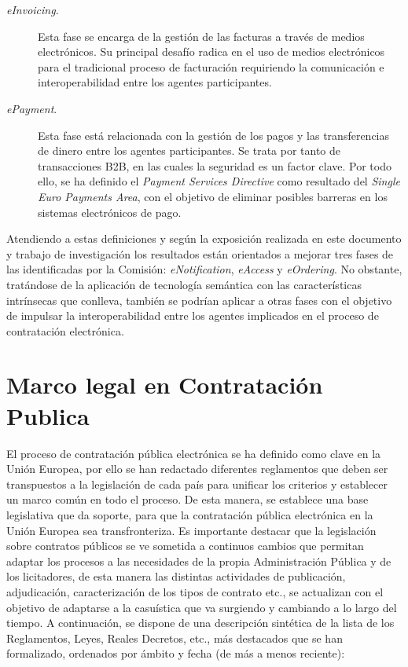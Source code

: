 \begin{description}
\item [\textit{eInvoicing}.] Esta fase se encarga de la gestión de las facturas a través de medios
electrónicos. Su principal desafío radica en el uso de medios electrónicos para el tradicional 
proceso de facturación requiriendo la comunicación e interoperabilidad entre los agentes
participantes.

\item [\textit{ePayment}.] Esta fase está relacionada con la gestión de los pagos y las transferencias
de dinero entre los agentes participantes. Se trata por tanto de transacciones B2B, en las cuales
la seguridad es un factor clave. Por todo ello, se ha definido el \textit{Payment Services Directive}
como resultado del \textit{Single Euro Payments Area}, con el objetivo de eliminar posibles barreras
en los sistemas electrónicos de pago.
\end{description}

Atendiendo a estas definiciones y según la exposición realizada en este documento y trabajo de investigación
los resultados están orientados a mejorar tres fases de las identificadas por la Comisión: 
\textit{eNotification}, \textit{eAccess} y \textit{eOrdering}. No obstante, tratándose de la aplicación
de tecnología semántica con las características intrínsecas que conlleva, también se podrían aplicar
a otras fases con el objetivo de impulsar la interoperabilidad entre los agentes implicados en el proceso
de contratación electrónica.

\section{Marco legal en Contratación Publica}
El proceso de contratación pública electrónica se ha definido como clave en la Unión Europea, por ello
se han redactado diferentes reglamentos que deben ser transpuestos a la legislación de cada país para unificar
los criterios y establecer un marco común en todo el proceso. De esta manera, se establece una
base legislativa que da soporte, para que la contratación pública electrónica en la Unión Europea sea transfronteriza. Es importante
destacar que la legislación sobre contratos públicos se ve sometida a continuos cambios que permitan adaptar los procesos a las
necesidades de la propia Administración Pública y de los licitadores, de esta manera las distintas actividades de publicación,
adjudicación, caracterización de los tipos de contrato etc.,  se actualizan con el objetivo de adaptarse a la casuística que
va surgiendo y cambiando a lo largo del tiempo. A continuación, se dispone de una descripción sintética de 
la lista de los Reglamentos, Leyes, Reales Decretos, etc., más destacados que se han formalizado, 
ordenados por ámbito y fecha (de más a menos reciente):

